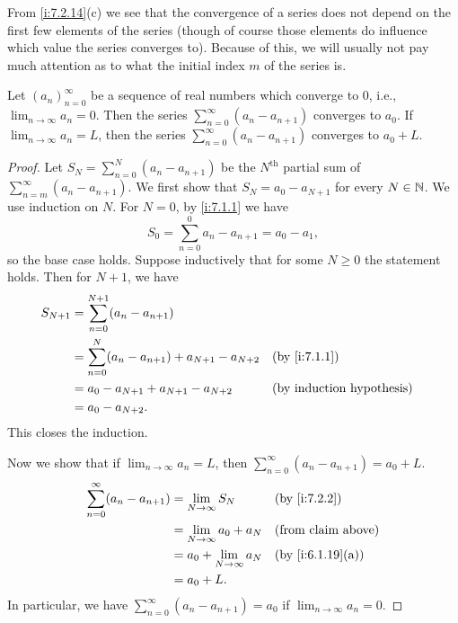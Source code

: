\begin{note}
  From \cref{i:7.2.14}(c) we see that the convergence of a series does not depend on the first few elements of the series
  (though of course those elements do influence which value the series converges to).
  Because of this, we will usually not pay much attention as to what the initial index \(m\) of the series is.
\end{note}

\begin{lem}\label{i:7.2.15}
  Let \((a_n)_{n = 0}^\infty\) be a sequence of real numbers which converge to \(0\), i.e., \(\lim_{n \to \infty} a_n = 0\).
  Then the series \(\sum_{n = 0}^\infty (a_n - a_{n + 1})\) converges to \(a_0\).
  If \(\lim_{n \to \infty} a_n = L\), then the series \(\sum_{n = 0}^\infty (a_n - a_{n + 1})\) converges to \(a_0 + L\).
\end{lem}

\begin{proof}
  Let \(S_N = \sum_{n = 0}^N (a_n - a_{n + 1})\) be the \(N^{\text{th}}\) partial sum of \(\sum_{n = m}^\infty (a_n - a_{n + 1})\).
  We first show that \(S_N = a_0 - a_{N + 1}\) for every \(N \in \mathbb{N}\).
  We use induction on \(N\).
  For \(N = 0\), by \cref{i:7.1.1} we have
  \[
    S_0 = \sum_{n = 0}^0 a_n - a_{n + 1} = a_0 - a_1,
  \]
  so the base case holds.
  Suppose inductively that for some \(N \geq 0\) the statement holds.
  Then for \(N + 1\), we have
  \begin{align*}
    S_{N + 1} & = \sum_{n = 0}^{N + 1} (a_n - a_{n + 1})                                     \\
              & = \sum_{n = 0}^N (a_n - a_{n + 1}) + a_{N + 1} - a_{N + 2} &  & \by{i:7.1.1} \\
              & = a_0 - a_{N + 1} + a_{N + 1} - a_{N + 2}                  &  & \byIH        \\
              & = a_0 - a_{N + 2}.
  \end{align*}
  This closes the induction.

  Now we show that if \(\lim_{n \to \infty} a_n = L\), then \(\sum_{n = 0}^\infty (a_n - a_{n + 1}) = a_0 + L\).
  \begin{align*}
    \sum_{n = 0}^\infty (a_n - a_{n + 1}) & = \lim_{N \to \infty} S_N       &  & \by{i:7.2.2}              \\
                                          & = \lim_{N \to \infty} a_0 + a_N &  & \text{(from claim above)} \\
                                          & = a_0 + \lim_{N \to \infty} a_N &  & \by{i:6.1.19}[a]          \\
                                          & = a_0 + L.
  \end{align*}
  In particular, we have \(\sum_{n = 0}^\infty (a_n - a_{n + 1}) = a_0\) if \(\lim_{n \to \infty} a_n = 0\).
\end{proof}

